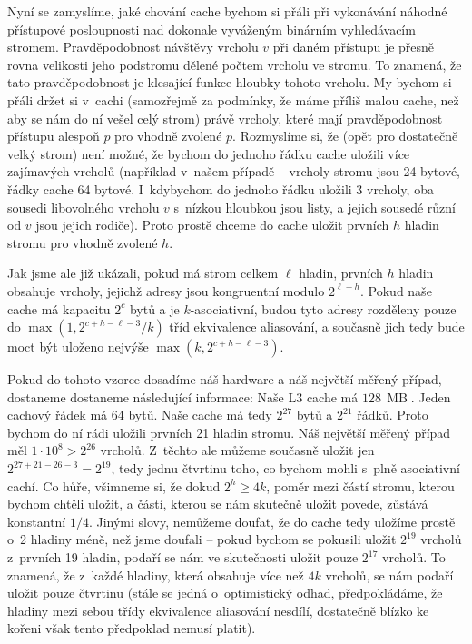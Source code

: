 Nyní se zamyslíme, jaké chování cache bychom si přáli při vykonávání náhodné přístupové posloupnosti nad dokonale vyváženým binárním vyhledávacím stromem. Pravděpodobnost návštěvy vrcholu $v$ při daném přístupu je přesně rovna velikosti jeho podstromu dělené počtem vrcholu ve stromu. To znamená, že tato pravděpodobnost je klesající funkce hloubky tohoto vrcholu. My bychom si přáli držet si v~cachi (samozřejmě za podmínky, že máme příliš malou cache, než aby se nám do ní vešel celý strom) právě vrcholy, které mají pravděpodobnost přístupu alespoň $p$ pro vhodně zvolené $p$. Rozmyslíme si, že (opět pro dostatečně velký strom) není možné, že bychom do jednoho řádku cache uložili více zajímavých vrcholů (například v~našem případě -- vrcholy stromu jsou 24 bytové, řádky cache 64 bytové. I~kdybychom do jednoho řádku uložili 3 vrcholy, oba sousedi libovolného vrcholu $v$ s~nízkou hloubkou jsou listy, a jejich sousedé různí od $v$ jsou jejich rodiče). Proto prostě chceme do cache uložit prvních $h$ hladin stromu pro vhodně zvolené $h$.

Jak jsme ale již ukázali, pokud má strom celkem $\ell$ hladin, prvních $h$
hladin obsahuje vrcholy, jejichž adresy jsou kongruentní modulo $2^{\ell - h}$.
Pokud naše cache má kapacitu $2^c$ bytů a je $k$-asociativní, budou tyto adresy
rozděleny pouze do $\max\left(1, 2^{c+h-\ell - 3}/k\right)$ tříd
ekvivalence aliasování, a současně jich tedy bude moct být uloženo nejvýše
$\max\left(k, 2^{c+h-\ell - 3}\right).$

Pokud do tohoto vzorce dosadíme náš hardware a náš největší měřený případ,
dostaneme dostaneme následující informace: Naše L3 cache má $128
\,\operatorname{MB}$. Jeden cachový řádek má 64 bytů. Naše cache má tedy
$2^{27}$ bytů a $2^{21}$ řádků. Proto bychom do ní rádi uložili prvních 21 hladin stromu. Náš
největší měřený případ měl $1\cdot 10^8 > 2 ^ {26}$ vrcholů. Z~těchto ale
můžeme současně uložit jen $2^{27 + 21 - 26 - 3} = 2^{19}$, tedy jednu čtvrtinu
toho, co bychom mohli s~plně asociativní cachí. Co hůře, všimneme si, že dokud
$2^h \geq 4k$, poměr mezi částí stromu, kterou bychom chtěli  uložit, a částí,
kterou se nám skutečně uložit povede, zůstává konstantní $1/4$. Jinými slovy,
nemůžeme doufat, že do cache tedy uložíme prostě o~2 hladiny méně, než jsme
doufali -- pokud bychom se pokusili uložit $2^{19}$ vrcholů z~prvních 19
hladin, podaří se nám ve skutečnosti uložit pouze $2^17$ vrcholů. To znamená,
že z~každé hladiny, která obsahuje více než $4k$ vrcholů, se nám podaří uložit
pouze čtvrtinu (stále se jedná o~optimistický odhad, předpokládáme, že hladiny
mezi sebou třídy ekvivalence aliasování nesdílí, dostatečně blízko ke kořeni
však tento předpoklad nemusí platit). 

